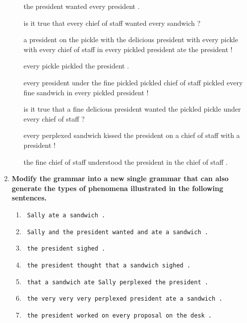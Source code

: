 \documentclass[10pt]{article}
\begin{document}
\begin{enumerate}
\begin{enumerate}
{\vspace{0.2cm}

the president wanted every president .

\vspace{0.2cm}

is it true that every chief of staff wanted every sandwich ?

\vspace{0.2cm}

a president on the pickle with the delicious president with every pickle with every chief of staff in every pickled president ate the president !

\vspace{0.2cm}

every pickle pickled the president .

\vspace{0.2cm}

every president under the fine pickled pickled chief of staff pickled every fine sandwich in every pickled president !

\vspace{0.2cm}

is it true that a fine delicious president wanted the pickled pickle under every chief of staff ?

\vspace{0.2cm}

every perplexed sandwich kissed the president on a chief of staff with a president !

\vspace{0.2cm}

the fine chief of staff understood the president in the chief of staff .

}

\end{enumerate}
\item {\bf Modify the grammar into a new single grammar that can also generate the types of
  phenomena illustrated in the following sentences.}
\begin{enumerate}
\item \verb| Sally ate a sandwich .|
\item \verb| Sally and the president wanted and ate a sandwich .|
\item \verb| the president sighed .|
\item \verb| the president thought that a sandwich sighed .|
\item \verb| that a sandwich ate Sally perplexed the president .|
\item \verb| the very very very perplexed president ate a sandwich .|
\item \verb| the president worked on every proposal on the desk .|
\end{enumerate}


\end{enumerate}
\end{document}

